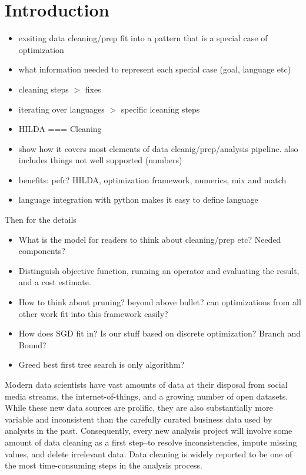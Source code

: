 \section{Introduction}\label{intro}\sloppy
\begin{itemize}
  \item exsiting data cleaning/prep fit into a pattern that is a special case of optimization
  \item what information needed to represent each special case (goal, language etc)
  \item cleaning steps $>$ fixes
  \item iterating over languages $>$ specific lceaning steps
  \item HILDA === Cleaning
  \item show how it covers most elements of data cleanig/prep/analysis pipeline.  also includes things not well supported (numbers)
  \item benefits: pefr? HILDA, optimization framework, numerics, mix and match
  \item language integration with python makes it easy to define language
\end{itemize}

Then for the details

\begin{itemize}
  \item What is the model for readers to think about cleaning/prep etc?  Needed components?
  \item Distinguish objective function, running an operator and evaluating the result, and a cost estimate.
  \item How to think about pruning? beyond above bullet?  can optimizations from all other work fit into this framework easily?
  \item How does SGD fit in?  Is our stuff based on discrete optimization?  Branch and Bound?
  \item Greed best first tree search is only algorithm?  

\end{itemize}

Modern data scientists have vast amounts of data at their disposal from social media streams, the internet-of-things, and a growing number of open datasets.
While these new data sources are prolific, they are also substantially more variable and inconsistent than the carefully curated business data used by analysts in the past.
Consequently, every new analysis project will involve some amount of data cleaning as a first step--to resolve inconsistencies, impute missing values, and delete irrelevant data.
Data cleaning is widely reported to be one of the most time-consuming steps in the analysis process.

